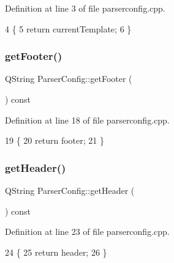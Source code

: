 Definition at line 3 of file parserconfig.\+cpp.


\begin{DoxyCode}
4 \{
5     \textcolor{keywordflow}{return} currentTemplate;
6 \}
\end{DoxyCode}
\mbox{\label{class_parser_config_ac42d4bcd85b1bb65840a5325926b96d4}} 
\subsubsection{\texorpdfstring{get\+Footer()}{getFooter()}}
{\footnotesize\ttfamily Q\+String Parser\+Config\+::get\+Footer (\begin{DoxyParamCaption}{ }\end{DoxyParamCaption}) const}



Definition at line 18 of file parserconfig.\+cpp.


\begin{DoxyCode}
19 \{
20     \textcolor{keywordflow}{return} footer;
21 \}
\end{DoxyCode}
\mbox{\label{class_parser_config_a336cf3ab9bd7c8bc894dcc2b383d3a7b}} 
\subsubsection{\texorpdfstring{get\+Header()}{getHeader()}}
{\footnotesize\ttfamily Q\+String Parser\+Config\+::get\+Header (\begin{DoxyParamCaption}{ }\end{DoxyParamCaption}) const}



Definition at line 23 of file parserconfig.\+cpp.


\begin{DoxyCode}
24 \{
25     \textcolor{keywordflow}{return} header;
26 \}
\end{DoxyCode}
\mbox{\label{class_parser_config_a0a9a65b537b8c7f4041d2b913c46fde7}} 
